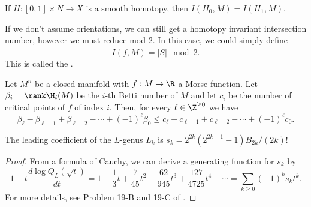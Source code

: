 \begin{corollary}
	If $H : [0,1]\times N \to X$ is a smooth homotopy, then $I(H_0, M) = I(H_1, M)$.
\end{corollary}

\begin{remark}
	If we don't assume orientations, we can still get a homotopy invariant intersection number, however we must reduce mod $2$. In this case, we could simply define
	\[
		\widetilde{I}(f,M) = |S|\mod 2.
	\]
	This is called the .
\end{remark}



\begin{theorem}
	Let $M^n$ be a closed manifold with $f : M\to \R$ a Morse function. Let $\beta_i=\rank \H_i(M)$ be the $i$-th Betti number of $M$ and let $c_i$ be the number of critical points of $f$ of index $i$. Then, for every $\ell\in \Z^{\geq 0}$ we have
	\begin{equation}
		\beta_\ell - \beta_{\ell-1} + \beta_{\ell-2} - \cdots +(-1)^\ell \beta_0 \leq c_\ell - c_{\ell-1} + c_{\ell-2} - \cdots + (-1)^\ell c_0.
	\end{equation}
\end{theorem}


\begin{proposition}\label{prop:leading_coefficient_L_genus}
	The leading coefficient of the $L$-genus $L_k$ is $s_k=2^{2k}(2^{2k-1}-1)B_{2k}/(2k)!$
\end{proposition}
\begin{proof}
	From a formula of Cauchy, we can derive a generating function for $s_k$ by
	\[
		1-t\frac{d\log Q_L(\sqrt{t})}{dt} = 1-\frac{1}{3}t + \frac{7}{45}t^2-\frac{62}{945}t^3+\frac{127}{4725}t^4-\cdots = \sum_{k\geq 0} (-1)^{k}s_k t^k.
	\]
	For more details, see Problem 19-B and 19-C of \cite{milnorstasheff1974}.
\end{proof}
